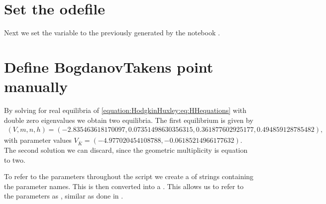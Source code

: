 \documentclass[letterpaper,10pt,english]{jupyterBook}
\begin{document}
\section{Set the odefile}
\label{\detokenize{HodgkinHuxley:set-the-odefile}}
\sphinxAtStartPar
Next we set the variable  to the  previously generated by
the notebook {\hyperref[\detokenize{HodgkinHuxleyGenSym::doc}]{}}.

\begin{sphinxVerbatim}[commandchars=\\\{\}]
\end{sphinxVerbatim}


\section{Define Bogdanov\sphinxhyphen{}Takens point manually}
\label{\detokenize{HodgkinHuxley:define-bogdanov-takens-point-manually}}
\sphinxAtStartPar
By solving for real equilibria of \eqref{equation:HodgkinHuxley:eq:HHequations} with double
zero eigenvalues we obtain two equilibria. The first equilibrium is given by
\begin{equation*}
\begin{split}
(V,m,n,h)  = (-2.835463618170097, 0.07351498630356315, 0.361877602925177, 0.494859128785482),
\end{split}
\end{equation*}
\sphinxAtStartPar
with parameter values \(V_{\bar K} = (-4.977020454108788,
-0.06185214966177632)\). The second solution we can discard, since the geometric
multiplicity is equation to two.

\sphinxAtStartPar
To refer to the parameters throughout the script we create a  of
strings containing the parameter names. This is then converted into a
. This allows us to refer to the parameters as ,
similar as done in .

\begin{sphinxVerbatim}[commandchars=\\\{\}]
\PYG{p}{[}\PYG{p}{]}
\PYG{p}{[}\PYG{p}{]}
\end{sphinxVerbatim}
\end{document}
